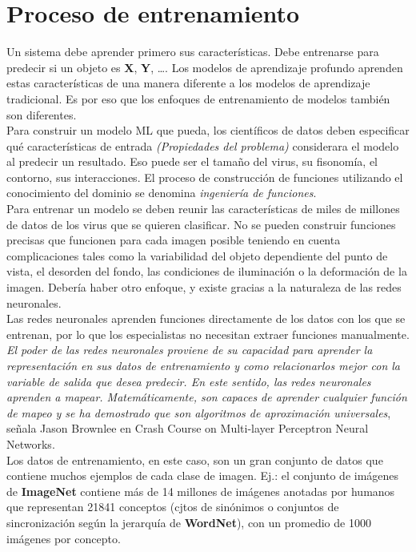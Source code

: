 \documentclass{book}
\begin{document}
		\section{Proceso de entrenamiento}
			Un sistema debe aprender primero sus caracter\'isticas. Debe entrenarse para predecir si un objeto es \textbf{X}, \textbf{Y}, …. Los modelos de aprendizaje profundo aprenden estas caracter\'isticas de una manera diferente a los modelos de aprendizaje tradicional. Es por eso que los enfoques de entrenamiento de modelos tambi\'en son diferentes. \\
			Para construir un modelo ML que pueda, los cient\'ificos de datos deben especificar qu\'e caracter\'isticas de entrada \textit{(Propiedades del problema)} considerara el modelo al predecir un resultado. Eso puede ser el tama\~no del virus, su fisonom\'ia, el contorno, sus interacciones. El proceso de construcci\'on de funciones utilizando el conocimiento del dominio se denomina \textit{ingenier\'ia de funciones}. \\
			Para entrenar un modelo se deben reunir las caracter\'isticas de miles de millones de datos de los virus que se quieren clasificar. No se pueden construir funciones precisas que funcionen para cada imagen posible teniendo en cuenta complicaciones tales como la variabilidad del objeto dependiente del punto de vista, el desorden del fondo, las condiciones de iluminaci\'on o la deformaci\'on de la imagen. Deber\'ia haber otro enfoque, y existe gracias a la naturaleza de las redes neuronales. \\
			Las redes neuronales aprenden funciones directamente de los datos con los que se entrenan, por lo que los especialistas no necesitan extraer funciones manualmente. \\
			\textit{El poder de las redes neuronales proviene de su capacidad para aprender la representaci\'on en sus datos de entrenamiento y como relacionarlos mejor con la variable de salida que desea predecir. En este sentido, las redes neuronales aprenden a mapear. Matem\'aticamente, son capaces de aprender cualquier funci\'on de mapeo y se ha demostrado que son algoritmos de aproximaci\'on universales}, se\~nala Jason Brownlee en Crash Course on Multi-layer Perceptron Neural Networks. \\
			Los datos de entrenamiento, en este caso, son un gran conjunto de datos que contiene muchos ejemplos de cada clase de imagen. Ej.: el conjunto de im\'agenes de \textbf{ImageNet} contiene m\'as de 14 millones de im\'agenes anotadas por humanos que representan 21841 conceptos (cjtos de sin\'onimos o conjuntos de sincronizaci\'on seg\'un la jerarqu\'ia de \textbf{WordNet}), con un promedio de 1000 im\'agenes por concepto. \\
\end{document}
